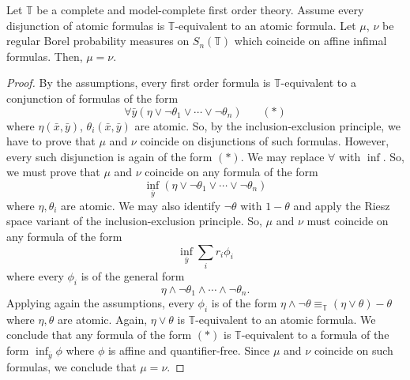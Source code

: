 \documentclass[10pt,a4paper]{amsart}
\def\x{\bar{x}}\def\y{\bar{y}}
\def\y{\bar{y}}
\begin{document}
\begin{lemma}\label{existential values}
Let $\mathbb T$ be a complete and model-complete first order theory. Assume every disjunction of atomic formulas is
$\mathbb{T}$-equivalent to an atomic formula. Let $\mu$, $\nu$ be regular Borel probability measures on
$S_n(\mathbb{T})$ which coincide on affine infimal formulas.
Then, $\mu=\nu$.
\end{lemma}

\begin{proof}
By the assumptions, every first order formula is $\mathbb{T}$-equivalent to a conjunction of formulas of the form
$$\forall\y(\eta\vee\neg\theta_1\vee\cdots\vee\neg\theta_n)\ \ \ \ \ \ \ \ (*)$$
where $\eta(\x,\y)$, $\theta_i(\x,\y)$ are atomic.
So, by the inclusion-exclusion principle, we have to prove that $\mu$ and $\nu$ coincide on
disjunctions of such formulas. However, every such disjunction is again of the form $(*)$.
We may replace $\forall$ with $\inf$. So, we must prove that $\mu$ and $\nu$
coincide on any formula of the form
$$\inf_{\y}(\eta\vee\neg\theta_1\vee\cdots\vee\neg\theta_n)$$
where $\eta,\theta_i$ are atomic.
We may also identify $\neg\theta$ with $1-\theta$
and apply the Riesz space variant of the inclusion-exclusion principle.
So, $\mu$ and $\nu$ must coincide on any formula of the form
$$\inf_{\y}\sum_i r_i\phi_i$$ where every $\phi_i$ is of the general form
$$\eta\wedge\neg\theta_1\wedge\cdots\wedge\neg\theta_n.$$
Applying again the assumptions, every $\phi_i$ is of the form
$\eta\wedge\neg\theta\equiv_{\mathbb T}(\eta\vee\theta)-\theta$
where $\eta,\theta$ are atomic.
Again, $\eta\vee\theta$ is $\mathbb T$-equivalent to an atomic formula.
We conclude that any formula of the form $(*)$ is $\mathbb{T}$-equivalent
to a formula of the form $\inf_{\y}\phi$ where $\phi$ is affine and quantifier-free.
Since $\mu$ and $\nu$ coincide on such formulas, we conclude that $\mu=\nu$.
\end{proof}
\end{document}
